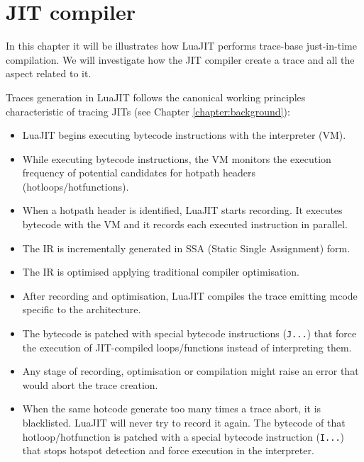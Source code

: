 \chapter{JIT compiler}
\label{chapter:jit-compiler}

\noindent
In this chapter it will be illustrates how LuaJIT performs trace-base just-in-time compilation. We will investigate how the JIT compiler create a trace and all the aspect related to it. 

Traces generation in LuaJIT follows the canonical working principles characteristic of tracing JITs (see Chapter \ref{chapter:background}):
\begin{itemize}
    \item LuaJIT begins executing bytecode instructions with the interpreter (VM).
    \item While executing bytecode instructions, the VM monitors the execution frequency of potential candidates for hotpath headers (hotloops/hotfunctions).
    \item When a hotpath header is identified, LuaJIT starts recording. It executes bytecode with the VM and it records each executed instruction in parallel.
    \item The IR is incrementally generated in SSA (Static Single Assignment) form.
    \item The IR is optimised applying traditional compiler optimisation.
    \item After recording and optimisation, LuaJIT compiles the trace emitting mcode specific to the architecture.
    \item The bytecode is patched with special bytecode instructions (\texttt{J...}) that force the execution of JIT-compiled loops/functions instead of interpreting them.
    \item Any stage of recording, optimisation or compilation might raise an error that would abort the trace creation.
    \item When the same hotcode generate too many times a trace abort, it is blacklisted. LuaJIT will never try to record it again. The bytecode of that hotloop/hotfunction is patched with a special bytecode instruction (\texttt{I...}) that stops hotspot detection and force execution in the interpreter.
\end{itemize}

